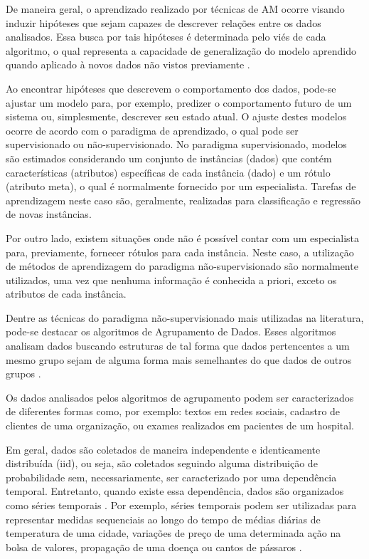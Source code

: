\documentclass[qual, classic, a4paper]{ufbathesis}
\begin{document}
De maneira geral, o aprendizado realizado por técnicas de \ac{AM} ocorre visando induzir hipóteses que sejam capazes de descrever relações entre os dados analisados. Essa busca por tais hipóteses é determinada pelo viés de cada algoritmo, o qual representa a capacidade de generalização do modelo aprendido quando aplicado à novos dados não vistos previamente \cite{faceli2011inteligencia}.

Ao encontrar hipóteses que descrevem o comportamento dos dados, pode-se ajustar um modelo para, por exemplo, predizer o comportamento futuro de um sistema ou, simplesmente, descrever seu estado atual. O ajuste destes modelos ocorre de acordo com o paradigma de aprendizado, o qual pode ser supervisionado ou não-supervisionado. No paradigma supervisionado, modelos são estimados considerando um conjunto de instâncias (dados) que contém características (atributos) específicas de cada instância (dado) e um rótulo (atributo meta), o qual é normalmente fornecido por um especialista. Tarefas de aprendizagem neste caso são, geralmente, realizadas para classificação e regressão de novas instâncias.

Por outro lado, existem situações onde não é possível contar com um especialista para, previamente, fornecer rótulos para cada instância. Neste caso, a utilização de métodos de aprendizagem do paradigma não-supervisionado são normalmente utilizados, uma vez que nenhuma informação é conhecida a priori, exceto os atributos de cada instância.

Dentre as técnicas do paradigma não-supervisionado mais utilizadas na literatura, pode-se destacar os algoritmos de Agrupamento de Dados. Esses algoritmos analisam dados buscando estruturas de tal forma que dados pertencentes a um mesmo grupo sejam de alguma forma mais semelhantes do que dados de outros grupos \cite{Mitchell:1997:ML:541177,faceli2011inteligencia, Aghabozorgi2015}.

Os dados analisados pelos algoritmos de agrupamento podem  ser caracterizados de diferentes formas como, por exemplo:  textos em redes sociais, cadastro de clientes de uma organização, ou exames realizados em pacientes de um hospital. 

Em geral, dados são coletados de maneira independente e identicamente distribuída (iid), ou seja, são coletados seguindo alguma distribuição de probabilidade sem, necessariamente, ser caracterizado por uma dependência temporal. Entretanto, quando existe essa dependência, dados são organizados como séries temporais \cite{Esling2012,box2015}. Por exemplo, séries temporais podem ser utilizadas para representar medidas sequenciais ao longo do tempo de médias diárias de temperatura de uma cidade, variações de preço de uma determinada ação na bolsa de valores, propagação de uma doença ou cantos de pássaros \cite{Esling2012}. 
\end{document}
